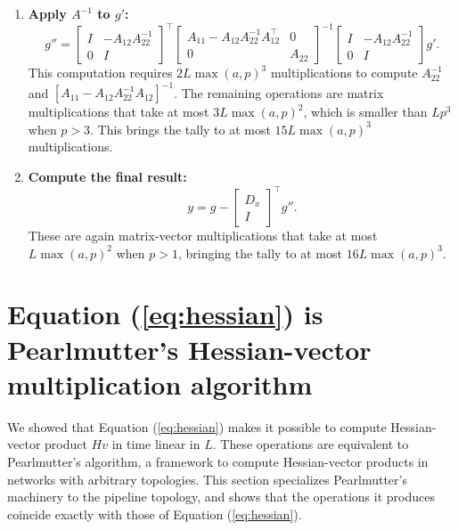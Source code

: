 \documentclass{article}
\begin{document}
\begin{enumerate}
  \item
    \textbf{Apply $A^{-1}$ to $g'$:}
    \[
      g'' =
      \begin{bmatrix}
        I & -A_{12} A_{22}^{-1} \\ 0 & I
      \end{bmatrix}
      ^\top
      \begin{bmatrix}
        A_{11} - A_{12} A_{22}^{-1} A_{12}^\top & 0      \\
        0                                       & A_{22}
      \end{bmatrix}
      ^{-1}
      \begin{bmatrix}
        I & -A_{12} A_{22}^{-1} \\ 0 & I
      \end{bmatrix}
      g'.
    \]
    This computation requires $2L\max(a,p)^3$ multiplications to compute $A_{22}^{-1}$ and $\left[A_{11}-A_{12}
    A_{22}^{-1}A_{12}\right]^{-1}$. The remaining operations are matrix multiplications that take at most $3L\max(a,p)^2$,
    which is smaller than $Lp^3$ when $p>3$. This brings the tally to at most $15L\max(a,p)^3$ multiplications.

  \item
    \textbf{Compute the final result:}
    \[
      y = g -
      \begin{bmatrix}
        D_x \\ I
      \end{bmatrix}
      ^\top g''.
    \]
    These are again matrix-vector multiplications that take at most $L\max(a,p)^2$ when $p>1$, bringing the tally to at
    most $16L\max(a,p)^3$.
\end{enumerate}




\appendix
\section{Equation (\ref{eq:hessian}) is Pearlmutter's Hessian-vector multiplication algorithm}
\label{sec:pearlmutter}

We showed that Equation (\ref{eq:hessian}) makes it possible to compute Hessian-vector product $H v$ in time linear in
$L$. These operations are equivalent to Pearlmutter's \cite{pearlmutter94} algorithm, a framework to compute
Hessian-vector products in networks with arbitrary topologies. This section specializes Pearlmutter's machinery to the
pipeline topology, and shows that the operations it produces coincide exactly with those of Equation
(\ref{eq:hessian}).
\end{document}
